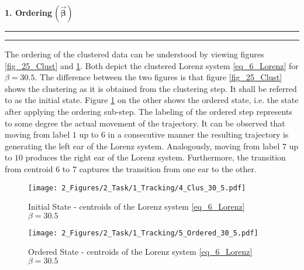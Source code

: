 \textbf{1. Ordering$\,(\vec{\boldsymbol\beta})$}
\hrule
\vspace{0.05cm}
\hrule
\vspace{0.25cm}
The ordering of the clustered data can be understood by viewing figures \ref{fig_25_Clust}  and \ref{fig_26_Ord}.
Both depict the clustered Lorenz system \eqref{eq_6_Lorenz} for $\beta = 30.5$. 
The difference between the two figures is that figure \ref{fig_25_Clust} shows the clustering as it is obtained from the clustering step. It shall be referred to as the initial state.
Figure \ref{fig_26_Ord} on the other shows the ordered state, i.e. the state after applying the ordering sub-step. The labeling of the ordered step represents to some degree the actual movement of the trajectory. 
It can be observed that moving from label $1$ up to $6$ in a consecutive manner the resulting trajectory is generating the left ear of the Lorenz system. 
Analogously, moving from label $7$ up to $10$ produces the right ear of the Lorenz system. Furthermore, the transition from centroid $6$ to $7$ captures the transition from one ear to the other.\newline 

\begin{figure}[!h]
     \begin{minipage}[h]{0.47\textwidth}
         \centering
         \texttt{[image: 2\_Figures/2\_Task/1\_Tracking/4\_Clus\_30\_5.pdf]}
         \caption{Initial State - centroids of the Lorenz system  \eqref{eq_6_Lorenz} $\beta =30.5$}
         \label{fig_25_Clust}    
     \end{minipage}
     \hfill
     \begin{minipage}{0.47\textwidth}
         \centering
         \texttt{[image: 2\_Figures/2\_Task/1\_Tracking/5\_Ordered\_30\_5.pdf]}
         \caption{Ordered State - centroids of the Lorenz system  \eqref{eq_6_Lorenz} $\beta =30.5$}
         \label{fig_26_Ord}    
     \end{minipage}
 \end{figure}

